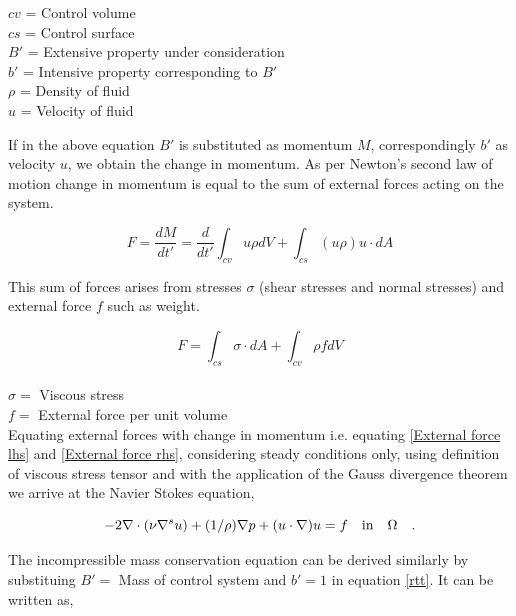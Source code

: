 \documentclass[a4paper,openany]{book}
\begin{document}
\begin{center}
$cv$ = Control volume\\
$cs$ = Control surface\\
$B'$ = Extensive property under consideration  \\
$b'$ = Intensive property corresponding to $B'$ \\
$\rho$ = Density of fluid \\
$u$ = Velocity of fluid\\
\end{center}

If in the above equation $B'$ is substituted as momentum $M$, correspondingly $b'$ as velocity $u$, we obtain the change in momentum. As per Newton's second law of motion change in momentum is equal to the sum of external forces acting on the system. 

\begin{equation}\label{External force lhs}
F = \frac{dM}{dt'} = \frac{d}{dt'} \int_{cv} u \rho dV + \int_{cs} (u \rho) u\cdot dA 
\end{equation}

This sum of forces arises from stresses $\sigma$ (shear stresses and normal stresses) and external force $f$ such as weight. 

\begin{equation}\label{External force rhs}
F = \int_{cs} \sigma \cdot dA + \int_{cv} \rho f dV
\end{equation}
\\
$\sigma =$ Viscous stress\\
$f =$ External force per unit volume\\

Equating external forces with change in momentum i.e. equating \eqref{External force lhs} and \eqref{External force rhs}, considering steady conditions only, using definition of viscous stress tensor and with the application of the Gauss divergence theorem we arrive at the Navier Stokes equation,

\begin{equation} \label{navier_stokes}
-2\nabla \cdot (\nu \nabla^s u) + (1/\rho) \nabla p + (u \cdot \nabla)u = f \quad   \textnormal{in}  \quad \Omega \quad \textrm{.}
\end{equation} 

The incompressible mass conservation equation can be derived similarly by substituing $B' =$ Mass of control system and $b' = 1$ in equation \eqref{rtt}.  It can be written as,
\end{document}
